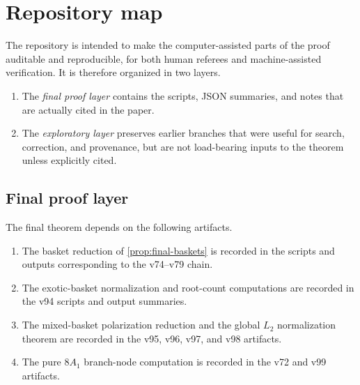 \documentclass[11pt]{article}
\theoremstyle{definition}
\begin{document}
\section{Repository map}\label{app:repo}
The repository is intended to make the computer-assisted parts of the proof auditable and reproducible, for both human referees and machine-assisted verification. It is therefore organized in two layers.

\begin{enumerate}[label=\textup{(\roman*)}]
\item The \emph{final proof layer} contains the scripts, JSON summaries, and notes that are actually cited in the paper.
\item The \emph{exploratory layer} preserves earlier branches that were useful for search, correction, and provenance, but are not load-bearing inputs to the theorem unless explicitly cited.
\end{enumerate}

\subsection*{Final proof layer}
The final theorem depends on the following artifacts.
\begin{enumerate}[label=\textup{(\Alph*)}]
\item The basket reduction of \cref{prop:final-baskets} is recorded in the scripts and outputs corresponding to the v74--v79 chain.
\item The exotic-basket normalization and root-count computations are recorded in the v94 scripts and output summaries.
\item The mixed-basket polarization reduction and the global $L_2$ normalization theorem are recorded in the v95, v96, v97, and v98 artifacts.
\item The pure $8A_1$ branch-node computation is recorded in the v72 and v99 artifacts.
\end{enumerate}
\end{document}
